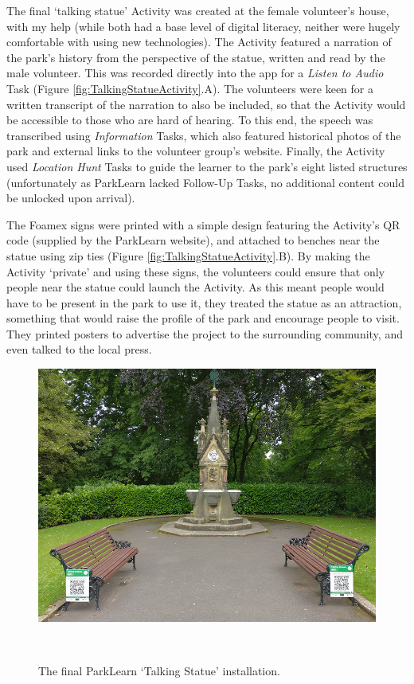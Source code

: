 The final `talking statue' Activity was created at the female volunteer's house, with my help (while both had a base level of digital literacy, neither were hugely comfortable with using new technologies). The Activity featured a narration of the park's history from the perspective of the statue, written and read by the male volunteer. This was recorded directly into the app for a \textit{Listen to Audio} Task (Figure \ref{fig:TalkingStatueActivity}.A). The volunteers were keen for a written transcript of the narration to also be included, so that the Activity would be accessible to those who are hard of hearing. To this end, the speech was transcribed using \textit{Information} Tasks, which also featured historical photos of the park and external links to the volunteer group's website. Finally, the Activity used \textit{Location Hunt} Tasks to guide the learner to the park's eight listed structures (unfortunately as ParkLearn lacked Follow-Up Tasks, no additional content could be unlocked upon arrival).

The Foamex signs were printed with a simple design featuring the Activity's QR code (supplied by the ParkLearn website), and attached to benches near the statue using zip ties (Figure \ref{fig:TalkingStatueActivity}.B). By making the Activity ‘private’ and using these signs, the volunteers could ensure that only people near the statue could launch the Activity. As this meant people would have to be present in the park to use it, they treated the statue as an attraction, something that would raise the profile of the park and encourage people to visit. They printed posters to advertise the project to the surrounding community, and even talked to the local press. 

\begin{figure}
  \centering
  \includegraphics[width=0.85\columnwidth]{images/chapter06/TalkingStatue.jpg}
  \caption[The ParkLearn `Talking Statue' installation]{The final ParkLearn `Talking Statue' installation.}~\label{fig:TalkingStatue}
\end{figure}

